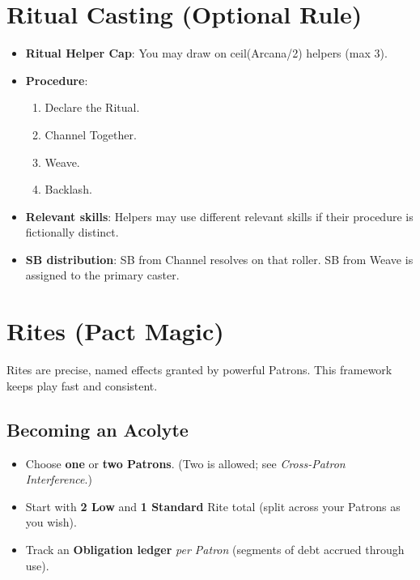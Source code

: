 \section{Ritual Casting (Optional Rule)}
\begin{itemize}
    \item \textbf{Ritual Helper Cap}: You may draw on ceil(Arcana/2) helpers (max 3).
    \item \textbf{Procedure}:
    \begin{enumerate}
        \item Declare the Ritual.
        \item Channel Together.
        \item Weave.
        \item Backlash.
    \end{enumerate}
    \item \textbf{Relevant skills}: Helpers may use different relevant skills if their procedure is fictionally distinct.
    \item \textbf{SB distribution}: SB from Channel resolves on that roller. SB from Weave is assigned to the primary caster.
\end{itemize}

\section{Rites (Pact Magic)}

Rites are precise, named effects granted by powerful Patrons. This framework keeps play fast and consistent.

\subsection{Becoming an Acolyte}
\begin{itemize}
  \item Choose \textbf{one} or \textbf{two Patrons}. (Two is allowed; see \emph{Cross-Patron Interference}.)
  \item Start with \textbf{2 Low} and \textbf{1 Standard} Rite total (split across your Patrons as you wish).
  \item Track an \textbf{Obligation ledger} \emph{per Patron} (segments of debt accrued through use).
\end{itemize}

